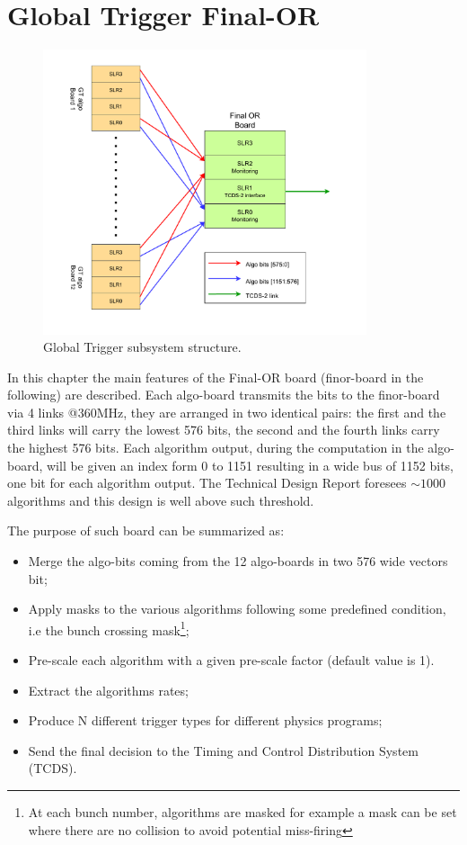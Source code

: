 \documentclass[../../main.tex]{subfiles}
\begin{document}
\chapter{Global Trigger Final-OR}
\label{sec:Finor}

\begin{figure}[h]
    \centering
    \includegraphics[width=0.85\textwidth]{sections/06/Images/GT_layout.pdf}
    \caption{Global Trigger subsystem structure.}
    \label{fig:GT_layout-finor}
\end{figure}

In this chapter the main features of the Final-OR board (finor-board in the following) are described.  
Each algo-board transmits the bits to the finor-board via 4 links @360MHz, they are arranged in two identical pairs: the first and the third links will carry the lowest 576 bits, the second and the fourth links carry the highest 576 bits. Each algorithm output, during the computation in the algo-board, will be given an index form 0 to 1151 resulting in a wide bus of 1152 bits, one bit for each algorithm output. The Technical Design Report foresees $\sim1000$ algorithms\cite{L1T-2up} and this design is well above such threshold. 

The purpose of such board can be summarized as:
\begin{itemize}
    \item Merge the algo-bits coming from the 12 algo-boards in two 576 wide vectors bit;
    \item Apply masks to the various algorithms following some predefined condition, i.e the bunch crossing mask\footnote{At each bunch number, algorithms are masked for example a mask can be set where there are no collision to avoid potential miss-firing};
    \item Pre-scale each algorithm with a given pre-scale factor (default value is 1).
    \item Extract the algorithms rates;
    \item Produce N different trigger types for different physics programs;
    \item Send the final decision to the Timing and Control Distribution System (TCDS).
\end{itemize}
\end{document}
